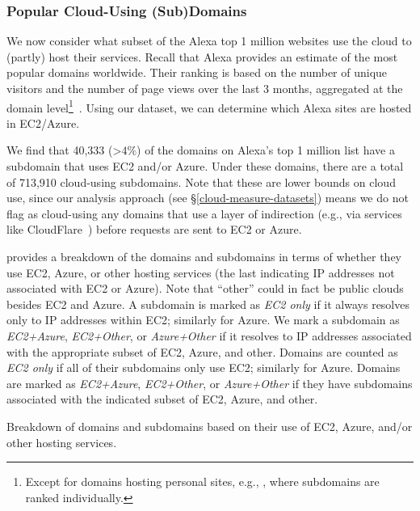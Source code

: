 \subsubsection{Popular Cloud-Using (Sub)Domains} 
\label{cloud-measure-global}

 We now consider what subset of the 
Alexa top 1 million websites use the cloud to (partly) host their services. 
Recall that Alexa provides an estimate of the most
popular domains worldwide. Their ranking is based on the number of unique
visitors and the number of page views over the last 3 months, aggregated at the
domain level\footnote{Except for domains hosting personal sites, e.g.,
, where subdomains are ranked
individually.}~\cite{alex_topdomains}.  
Using our \alexadata dataset, we can determine which Alexa sites are hosted in
EC2/Azure.

We find that 40,333 ($\mathord{>}4\%$) of the domains on Alexa's top 1 million
list have a subdomain that uses EC2 and/or Azure.
Under these domains, there are a
total of 713,910 cloud-using subdomains. 
Note that these are lower bounds on cloud use, since our
analysis approach (see \S\ref{cloud-measure-datasets}) means we do not flag as
cloud-using any domains that use a layer of indirection (e.g., via services
like CloudFlare~\cite{cloudflare}) before requests are sent to EC2 or Azure. 

 provides a breakdown of the domains and
subdomains in terms of whether they use EC2, Azure, or other hosting
services (the last indicating
IP addresses not associated with EC2 or Azure).  Note that ``other''
could in fact be public clouds besides EC2 and Azure. 
A subdomain is marked as {\em EC2 only} if it always resolves only to IP 
addresses within EC2; similarly for Azure. We mark a subdomain as {\em
EC2+Azure}, {\em EC2+Other}, or {\em Azure+Other} if it resolves to IP 
addresses associated with the appropriate subset of EC2, Azure, and other.
Domains are counted as {\em EC2 only}
if all of their subdomains only use EC2; similarly for Azure. Domains are 
marked as {\em EC2+Azure}, {\em EC2+Other}, or {\em Azure+Other} if they have 
subdomains associated with
the indicated subset of EC2, Azure, and other. 

\begin{table}[!t]
\centering
\small

\caption{Breakdown of domains and subdomains based on their use of EC2, 
    Azure, and/or other hosting services.}
\label{tab:hybrid_cloud}
\end{table}





